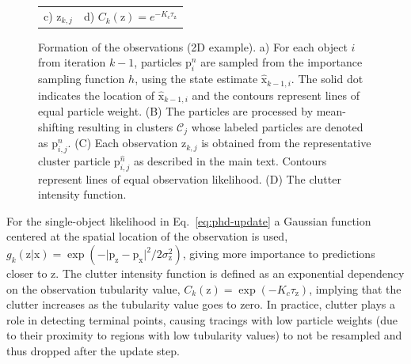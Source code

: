 \begin{figure}
\begin{tabular}{c@{\hspace{2em}}c}
		c) $\mathrm{z}_{k,j}$ &
		d) $C_k(\mathrm{z}) = e^{-K_c\tau_{\mathrm{z}}}$ 
	\end{tabular}
	\caption{Formation of the observations (2D example). a) For each object $i$ from iteration $k-1$, particles $\mathrm{p}_{i}^{n}$ are sampled from the importance sampling function $h$, using the state estimate $\hat{\mathrm{x}}_{k-1,i}$. The solid dot indicates the location of $\hat{\mathrm{x}}_{k-1,i}$ and the contours represent lines of equal particle weight. (B) The particles are processed by mean-shifting resulting in clusters $\mathscr{C}_j$ whose labeled particles are denoted as $\mathrm{p}_{i,j}^{n}$. (C) Each observation $\mathrm{z}_{k,j}$ is obtained from the representative cluster particle $\mathrm{p}_{i,j}^{\hat{n}}$ as described in the main text. Contours represent lines of equal observation likelihood. (D) The clutter intensity function.} 
	\label{ch3_fig4}
\end{figure}
For the single-object likelihood in Eq.~\ref{eq:phd-update} a Gaussian function centered at the spatial location of the observation is used, $g_k(\mathrm{z}|\mathrm{x})=\exp(-\vert\mathrm{p}_{\mathrm{z}}-\mathrm{p}_{\mathrm{x}}\vert^2/2\sigma_{\mathrm{z}}^2)$, giving more importance to predictions closer to $\mathrm{z}$. The clutter intensity function is defined as an exponential dependency on the observation tubularity value, $C_k(\mathrm{z})=\exp(-K_{c}\tau_{\mathrm{z}})$, implying that the clutter increases as the tubularity value goes to zero. In practice, clutter plays a role in detecting terminal points, causing tracings with low particle weights (due to their proximity to regions with low tubularity values) to not be resampled and thus dropped after the update step.
